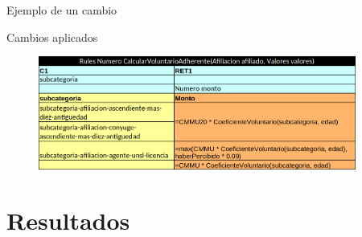 \documentclass[10pt]{beamer}
\begin{document}
\begin{frame}{Ejemplo de un cambio}
    \begin{block}{Cambios aplicados}
        \begin{figure}
            \centering
            \includegraphics[width=0.93\textwidth]{tables/voluntario_cambios.png}
        \end{figure}
    \end{block}
\end{frame}

\section{Resultados}
\end{document}
